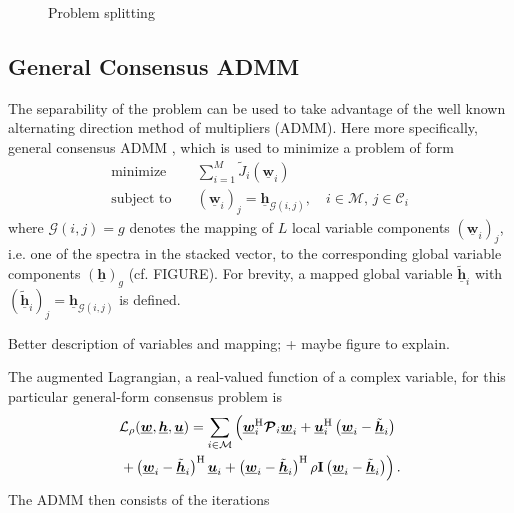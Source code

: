 \documentclass{article}
\newcommand{\hf}{\underline{\bm{h}}}
\newcommand{\wf}{\underline{\bm{w}}}
\newcommand{\uuf}{\underline{\bm{u}}}
\newcommand{\aRhof}{\bm{\mathcal{P}}}
\newcommand{\I}{\mtxb{I}}
\newcommand{\Cset}{\mathcal{C}}
\newcommand{\Mset}{\mathcal{M}}
\begin{document}
\begin{figure}
    \centering
    
    \caption{Problem splitting}
    \label{fig:problem_splitting:problem_splitting_matrix}
\end{figure}

\subsection{General Consensus ADMM}
\label{ssec:general_consensus_admm}
The separability of the problem can be used to take advantage of the well known alternating direction method of multipliers (ADMM).
Here more specifically, general consensus ADMM \cite{}, which is used to minimize a problem of form
\begin{align}
    \operatorname{minimize} \quad &\sum_{i=1}^{M} \tilde{J}_i(\wf_i)\\
    \text{subject to} \quad &(\wf_i)_j = \hf_{\mathcal{G}(i,j)},\quad i \in \Mset,\,j \in \Cset_i
\end{align}
where \(\mathcal{G}(i,j)=g\) denotes the mapping of \(L\) local variable components \((\wf_i)_j\), i.e. one of the spectra in the stacked vector, to the corresponding global variable components \((\hf)_g\) (cf. FIGURE). For brevity, a mapped global variable \(\tilde{\hf}_i\) with \((\tilde{\hf}_i)_j = \hf_{\mathcal{G}(i,j)}\) is defined.
\begin{note}
    Better description of variables and mapping; + maybe figure to explain.
\end{note}
The augmented Lagrangian, a real-valued function of a complex variable, for this particular general-form consensus problem is
\begin{align}
    &\mathcal{L}_{\rho} (\wf,\hf,\uuf) = \sum_{i \in \Mset} \left( \wf_i^\herm \aRhof_i \wf_i + \uuf_i^{\herm} \left(\wf_i - \tilde{\hf}_i\right)\vphantom{+ \frac{\rho}{2} \left\| \wf_i - \tilde{\hf}_i \right\|^2} \right.\nonumber\\
    &\left. + \left(\wf_i - \tilde{\hf}_i\right)^\herm \uuf_i + \left( \wf_i - \tilde{\hf}_i \right)^\herm \rho \I \left( \wf_i - \tilde{\hf}_i \right) \right).\label{eq:general_consensus_admm:lagrangian}
\end{align}
The ADMM then consists of the iterations
\end{document}
